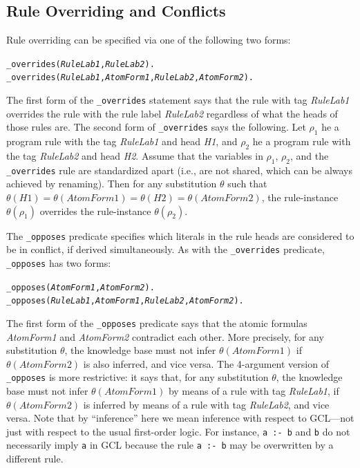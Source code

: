\documentclass[11pt]{article}
\begin{document}
\subsection{Rule Overriding and Conflicts}\label{sec-overriding-conflict}

Rule overriding can be specified via one of the following two forms:
\begin{alltt}
  _overrides({\em{}RuleLab1},\emph{RuleLab2}).
  _overrides({\em{}RuleLab1},{\em{}AtomForm1},{\em{}RuleLab2},\emph{AtomForm2}).
\end{alltt}
The first form of the {\tt \_overrides} statement says that the rule with
tag \emph{RuleLab1} overrides the rule with the rule label
\emph{RuleLab2} regardless of what the heads of those rules are. The second
form of {\tt \_overrides} says the following. Let $\rho_1$ he a program
rule with the tag \emph{RuleLab1} and head \emph{H1}, and $\rho_2$ he a
program rule with the tag \emph{RuleLab2} and head \emph{H2}. Assume that
the variables in $\rho_1$, $\rho_2$, and the {\tt \_overrides} rule are
standardized apart (i.e., are not shared, which can be always achieved by
renaming).   Then for any substitution $\theta$ such that $\theta(H1) =
\theta(AtomForm1) = \theta(H2) = \theta(AtomForm2)$, the rule-instance
$\theta(\rho_1)$ overrides the rule-instance $\theta(\rho_2)$.

The {\tt \_opposes} predicate specifies which literals in the rule heads
are considered to be in conflict, if derived simultaneously. As with the
{\tt \_overrides} predicate, {\tt \_opposes} has two forms:
\begin{alltt}
  _opposes({\em{}AtomForm1},\emph{AtomForm2}).
  _opposes({\em{}RuleLab1},{\em{}AtomForm1},{\em{}RuleLab2},\emph{AtomForm2}).
\end{alltt}
The first form of the {\tt \_opposes} predicate says that the atomic
formulas \emph{AtomForm1} and \emph{AtomForm2} contradict each other.  More
precisely, for any substitution $\theta$, the knowledge
base must not infer $\theta(AtomForm1)$ if $\theta(AtomForm2)$ is also
inferred, and vice versa.  The 4-argument version of {\tt \_opposes} is
more restrictive: it says that, for any substitution $\theta$, the
knowledge base must not infer $\theta(AtomForm1)$ by means of a rule with
tag \emph{RuleLab1}, if $\theta(AtomForm2)$ is inferred by means of a
rule with tag \emph{RuleLab2}, and vice versa.
Note that by ``inference'' here we mean inference with respect to GCL---not just
with respect to the usual first-order logic. For instance, {\tt a :- b} and
{\tt b} do not necessarily imply {\tt a} in GCL because the rule {\tt a :-
  b} may be overwritten by a different rule.      
\end{document}
